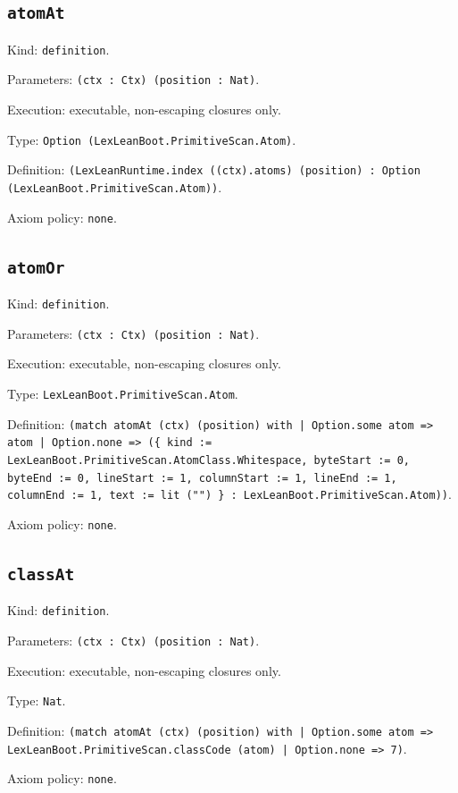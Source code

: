 \documentclass[11pt]{article}
\begin{document}
\subsection*{\texttt{atomAt}}
\noindent Kind: \texttt{definition}.\par
\noindent Parameters: \texttt{(ctx : Ctx) (position : Nat)}.\par
\noindent Execution: executable, non-escaping closures only.\par
\noindent Type: \texttt{Option (LexLeanBoot.PrimitiveScan.Atom)}.\par
\noindent Definition: \texttt{(LexLeanRuntime.index ((ctx).atoms) (position) : Option (LexLeanBoot.PrimitiveScan.Atom))}.\par
\noindent Axiom policy: \texttt{none}.\par
\subsection*{\texttt{atomOr}}
\noindent Kind: \texttt{definition}.\par
\noindent Parameters: \texttt{(ctx : Ctx) (position : Nat)}.\par
\noindent Execution: executable, non-escaping closures only.\par
\noindent Type: \texttt{LexLeanBoot.PrimitiveScan.Atom}.\par
\noindent Definition: \texttt{(match atomAt (ctx) (position) with | Option.some atom => atom | Option.none => (\{ kind := LexLeanBoot.PrimitiveScan.AtomClass.Whitespace, byteStart := 0, byteEnd := 0, lineStart := 1, columnStart := 1, lineEnd := 1, columnEnd := 1, text := lit ("") \} : LexLeanBoot.PrimitiveScan.Atom))}.\par
\noindent Axiom policy: \texttt{none}.\par
\subsection*{\texttt{classAt}}
\noindent Kind: \texttt{definition}.\par
\noindent Parameters: \texttt{(ctx : Ctx) (position : Nat)}.\par
\noindent Execution: executable, non-escaping closures only.\par
\noindent Type: \texttt{Nat}.\par
\noindent Definition: \texttt{(match atomAt (ctx) (position) with | Option.some atom => LexLeanBoot.PrimitiveScan.classCode (atom) | Option.none => 7)}.\par
\noindent Axiom policy: \texttt{none}.\par
\end{document}
